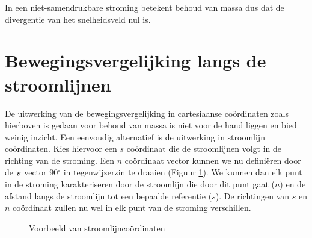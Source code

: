 In een niet-samendrukbare stroming betekent behoud van massa dus dat de divergentie van het snelheidsveld nul is.

	\section{Bewegingsvergelijking langs de stroomlijnen}
	\label{sec:Bewegingsvergelijking langs de stroomlijnen}
De uitwerking van de bewegingsvergelijking in cartesiaanse coördinaten zoals hierboven is gedaan voor behoud van massa is niet voor de hand liggen en bied weinig inzicht. Een eenvoudig alternatief is de uitwerking in stroomlijn coördinaten. Kies hiervoor een $s$ coördinaat die de stroomlijnen volgt in de richting van de stroming. Een $n$ coördinaat vector kunnen we nu definiëren door de $\boldsymbol{s}$ vector 90$^\circ$ in tegenwijzerzin te draaien (Figuur \ref{fig:stroomlijncoordinaten}). We kunnen dan elk punt in de stroming karakteriseren door de stroomlijn die door dit punt gaat ($n$) en de afstand langs de stroomlijn tot een bepaalde referentie ($s$). De richtingen van $s$ en $n$ coördinaat zullen nu wel in elk punt van de stroming verschillen. 
\begin{figure}[htb]
	\centering
	
	\caption{Voorbeeld van stroomlijncoördinaten}
	\label{fig:stroomlijncoordinaten}
\end{figure}

